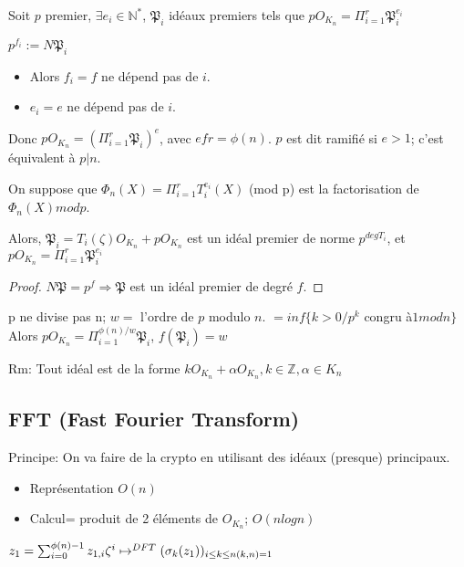Soit $p$ premier, $\exists e_i \in \mathbb{N}^*$, $\mathfrak{P}_i$ idéaux premiers tels que
$p O_{K_n} = \Pi_{i=1}^{r} \mathfrak{P}_i^{e_i}$

\begin{proposition}
$p^{f_i}:=N \mathfrak{P}_i$
\begin{itemize}
\item Alors $f_i=f$ ne dépend pas de $i$.
\item $e_i=e$ ne dépend pas de $i$.
\end{itemize}

Donc $p O_{K_n}=(\Pi_{i=1}^{r} \mathfrak{P}_i)^e$, avec $e f r= \phi(n)$.
$p$ est dit ramifié si $e > 1$; c'est équivalent à $p | n$.
\end{proposition}

\begin{theorem}
On suppose que
$\Phi_n(X)=\Pi_{i=1}^{r} T_i^{e_i}(X)$ (mod p)
est la factorisation de $\Phi_n(X) mod p$.

Alors, $\mathfrak{P}_i= T_i(\zeta) O_{K_n}+p O_{K_n}$ est un idéal premier de norme $p^{deg T_i}$, et $p O_{K_n} = \Pi_{i=1}^{r} \mathfrak{P}_i^{e_i}$
\end{theorem}

\begin{proof}
$N \mathfrak{P} = p^f \Rightarrow \mathfrak{P}$ est un idéal premier de degré $f$.
\end{proof}

\begin{corollary}
p ne divise pas n; $w=$ l'ordre de $p$ modulo $n$. $=inf\{ k >0 / p^k$ congru à$1 mod n \}$
Alors $p O_{K_n}=\Pi_{i=1}^{\phi(n)/w} \mathfrak{P}_i$, $f(\mathfrak{P}_i)=w$
\end{corollary}

Rm: Tout idéal est de la forme $k O_{K_n}+ \alpha O_{K_n}, k \in \mathbb{Z}, \alpha \in K_n$

\subsection{FFT (Fast Fourier Transform)}

Principe: On va faire de la crypto en utilisant des idéaux (presque) principaux.
\begin{itemize}
\item Représentation $O(n)$
\item Calcul= produit de 2 éléments de $O_{K_n}$; $O(n log n)$
\end{itemize}

$z_1 = \sum_{i=0}^{\phi(n)-1} z_{1,i} \zeta^i \mapsto^{DFT} (\sigma_k(z_1))_{i\le k \le n \\ (k, n)=1}$

